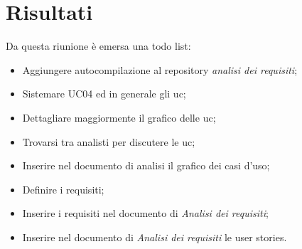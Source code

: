 \section{Risultati}

Da questa riunione è emersa una todo list:
\begin{itemize}
    \item Aggiungere autocompilazione al repository \textit{analisi dei requisiti};
    \item Sistemare UC04 ed in generale gli uc;
    \item Dettagliare maggiormente il grafico delle uc;
    \item Trovarsi tra analisti per discutere le uc;
    \item Inserire nel documento di analisi il grafico dei casi d'uso;
    \item Definire i requisiti;
    \item Inserire i requisiti nel documento di \textit{Analisi dei requisiti};
    \item Inserire nel documento di \textit{Analisi dei requisiti} le user stories.
\end{itemize}